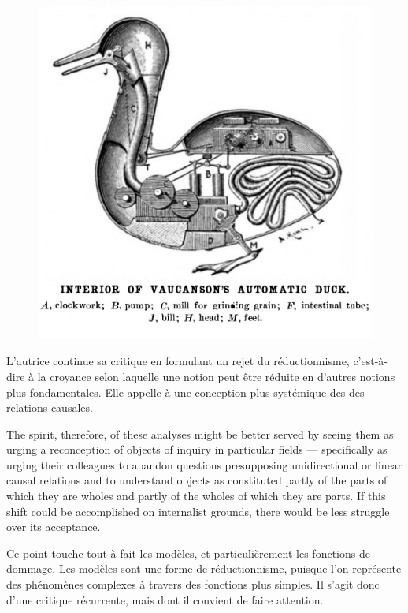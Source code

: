 \begin{figure}
    \centering
    \includegraphics[width=0.75\linewidth]{reductionisme.png}
    \label{fig:reductionnisme}
\end{figure}

\begin{displayquote}
    
\end{displayquote}

L'autrice continue sa critique en formulant un rejet du réductionnisme, c'est-à-dire à la croyance selon laquelle une notion peut être réduite en d'autres notions plus fondamentales. Elle appelle à une conception plus systémique des des relations causales. 

\begin{displayquote}
    The spirit, therefore, of these analyses might be better served by seeing them as urging a reconception of objects of inquiry in particular fields — specifically as urging their colleagues to abandon questions presupposing unidirectional or linear causal relations and to understand objects as constituted partly of the parts of which they are wholes and partly of the wholes of which they are parts. If this shift could be accomplished on internalist grounds, there would be less struggle over its acceptance.
\end{displayquote}

Ce point touche tout à fait les modèles, et particulièrement les fonctions de dommage. Les modèles sont une forme de réductionnisme, puisque l'on représente des phénomènes complexes à travers des fonctions plus simples. Il s'agit donc d'une critique récurrente, mais dont il convient de faire attention. \\


